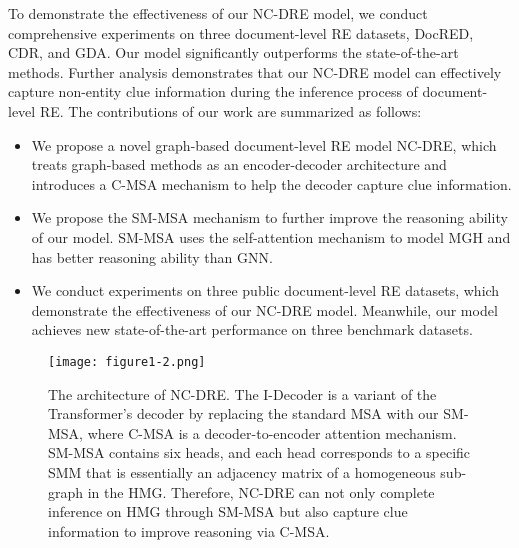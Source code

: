 \documentclass[sigconf,natbib=true]{acmart}
\begin{document}
To demonstrate the effectiveness of our NC-DRE model, we conduct comprehensive experiments on three document-level RE datasets, DocRED, CDR, and GDA. 
Our model significantly outperforms the state-of-the-art methods. 
Further analysis demonstrates that our NC-DRE model can effectively capture non-entity clue information during the inference process of document-level RE.
The contributions of our work are summarized as follows:
\begin{itemize}
    \item We propose a novel graph-based document-level RE model NC-DRE, which treats graph-based methods as an encoder-decoder architecture and introduces a C-MSA mechanism to help the decoder capture clue information.
    \item We propose the SM-MSA mechanism to further improve the reasoning ability of our model.
    SM-MSA uses the self-attention mechanism to model MGH and has better reasoning ability than GNN.
    \item We conduct experiments on three public document-level RE datasets, which demonstrate the effectiveness of our NC-DRE model.  
    Meanwhile, our model achieves new state-of-the-art performance on three benchmark datasets.
\end{itemize}


\begin{figure*}[t]
\centering
\texttt{[image: figure1-2.png]} %
\caption{
The architecture of NC-DRE. 
The I-Decoder is a variant of the Transformer's decoder by replacing the standard MSA with our SM-MSA, where C-MSA is a decoder-to-encoder attention mechanism.
SM-MSA contains six heads, and each head corresponds to a specific SMM that is essentially an adjacency matrix of a homogeneous sub-graph in the HMG.
Therefore, NC-DRE can not only complete inference on HMG through SM-MSA but also capture clue information to improve reasoning via C-MSA.
}
\label{fig3}
\end{figure*}
\end{document}
